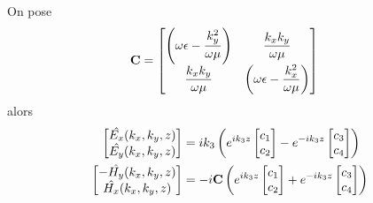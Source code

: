     \begin{prop}
        On pose
        \begin{align}
            \mathbf{C} &=
            \begin{bmatrix}
                \left(\omega\epsilon-\dfrac{k_y^2}{\omega\mu}\right) & \dfrac{k_xk_y}{\omega\mu}\\
                \dfrac{k_xk_y}{\omega\mu} & \left(\omega\epsilon-\dfrac{k_x^2}{\omega\mu}\right)
            \end{bmatrix}
        \end{align}
        alors
        \begin{subequations}
            \label{eq:imp_fourier:plan:champs}
            \begin{align}
                \begin{bmatrix}
                    \hat{E_x}(k_x,k_y,z)\\
                    \hat{E_y}(k_x,k_y,z)\\
                \end{bmatrix}
                &=ik_3\left( e^{ik_3 z}
                \begin{bmatrix}
                    c_1 \\
                    c_2
                \end{bmatrix}
                -e^{-ik_3 z}
                \begin{bmatrix}
                    c_3 \\
                    c_4
                \end{bmatrix}
                \right)
                \label{eq:imp_fourier:plan:champs:E}
                \\
                \begin{bmatrix}
                    -\hat{H_y}(k_x,k_y,z)\\
                    \hat{H_x}(k_x,k_y,z)\\
                \end{bmatrix}
                &=-i
                \mathbf{C}
                \left(
                    e^{ik_3 z}
                    \begin{bmatrix}
                        c_1 \\
                        c_2
                    \end{bmatrix}
                    +e^{-ik_3 z}
                    \begin{bmatrix}
                        c_3 \\
                        c_4
                    \end{bmatrix}
                \right)
                \label{eq:imp_fourier:plan:champs:H}
            \end{align}
        \end{subequations}
    \end{prop}

